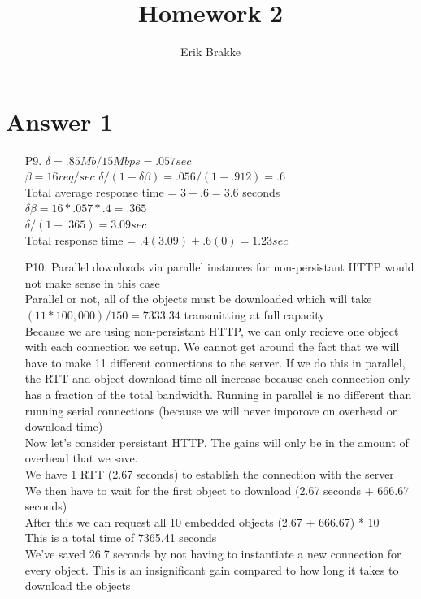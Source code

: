 \documentclass[11pt]{article}
\theoremstyle{definition}
\begin{document}
\title{Homework 2}
\author{Erik Brakke}
\maketitle

\thispagestyle{fancy}
 
 
\section*{Answer 1}

\begin{enumerate}
\item[P9.] $\delta = .85Mb/15Mbps = .057sec$\\
$\beta = 16 req/sec$
$\delta / (1 - \delta\beta) = .056 / (1 - .912) = .6$\\
Total average response time = $3 + .6 = 3.6$ seconds\\
\newline
$\delta\beta = 16 * .057 * .4 = .365$\\
$\delta / (1 - .365) = 3.09sec$\\
Total response time = $.4(3.09) + .6(0) = 1.23sec$\\

\item[P10.] Parallel downloads via parallel instances for non-persistant HTTP would not make sense in this case\\
Parallel or not, all of the objects must be downloaded which will take $(11 * 100,000)/150 = 7333.34$ transmitting at full capacity\\
Because we are using non-persistant HTTP, we can only recieve one object with each connection we setup.  We cannot get around the fact that we will have to make 11 different connections to the server.  If we do this in parallel, the RTT and object download time all increase because each connection only has a fraction of the total bandwidth.  Running in parallel is no different than running serial connections (because we will never imporove on overhead or download time)\\
\newline
Now let's consider persistant HTTP.  The gains will only be in the amount of overhead that we save.\\
We have 1 RTT (2.67 seconds) to establish the connection with the server\\
We then have to wait for the first object to download (2.67 seconds + 666.67 seconds)\\
After this we can request all 10 embedded objects (2.67 + 666.67) * 10\\
This is a total time of 7365.41 seconds\\
We've saved 26.7 seconds by not having to instantiate a new connection for every object.  This is an insignificant gain compared to how long it takes to download the objects\\


\end{enumerate}
\end{document}
